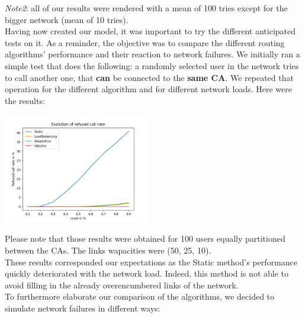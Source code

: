 \documentclass[lettersize,journal]{IEEEtran} %
\begin{document}
\emph{Note2}: all of our results were rendered with a mean of 100 tries except for the bigger network (mean of 10 tries).\\
Having now created our model, it was important to try the different anticipated tests on it. As a reminder, the objective was to
compare the different routing algorithms' performance and their reaction to network failures.
We initially ran a simple test that does the following: a randomly selected user in the network tries to call another one, that
\textbf{can} be connected to the \textbf{same CA}. We repeated that operation for the different algorithm and for different
network loads. Here were the results:
\begin{center}
\includegraphics[width=0.48\textwidth]{images/call_rate.png}
\end{center}
Please note that those results were obtained for 100 users equally partitioned between the CAs. The
links wapacities were (50, 25, 10).\\
These results corresponded our expectations as the Static method's performance quickly deteriorated with the network load. Indeed, 
this method is not able to avoid filling in the already overencumbered links of the network.\\
To furthermore elaborate our comparison of the algorithms, we decided to simulate network failures in different ways:
\end{document}
